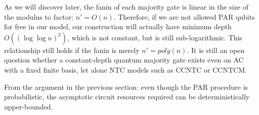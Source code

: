 As we will discover later, the fanin of each majority gate is
linear in the size of the modulus to factor: $n' = O(n)$.
Therefore, if we are not allowed PAR qubits for free in our model,
our construction will actually have minimum depth $O((\log\log n)^2)$,
which is not constant, but is still sub-logarithmic. This relationship still
holds if the fanin is merely $n' = poly(n)$. It is still an
open question \cite{Hoyer2002} whether a constant-depth
quantum majority gate exists even on \textsf{AC} with a fixed finite basis,
let alone \textsf{NTC} models such as \textsf{CCNTC} or \textsf{CCNTCM}.

From the argument in the previous section: even though the PAR procedure is
probabilistic, the asymptotic circuit resources required can be
deterministically upper-bounded.
